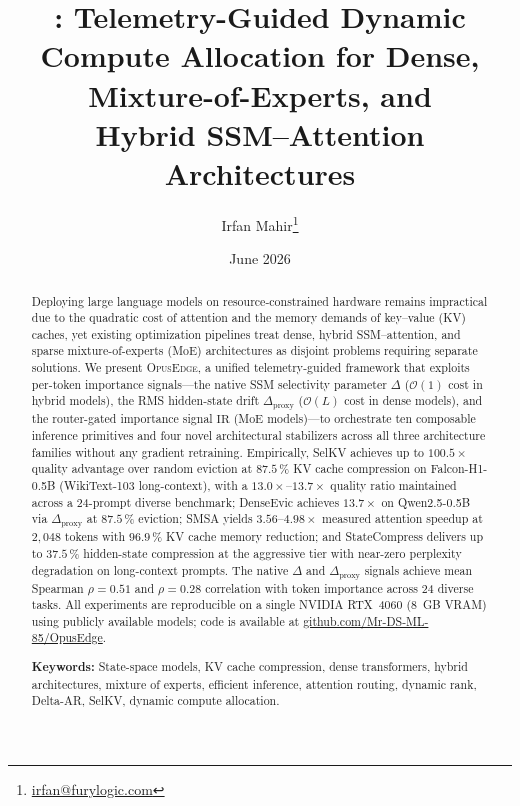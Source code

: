 \documentclass[11pt]{article}
\title{\textbf{\opusedge{}: Telemetry-Guided Dynamic Compute Allocation for
       Dense, Mixture-of-Experts, and\\ Hybrid SSM--Attention Architectures}}
\author[1]{Irfan Mahir\thanks{\href{mailto:irfan@furylogic.com}{irfan@furylogic.com}}}
\affil[1]{Furylogic Labs / Independent Researcher, Bangladesh \\
          Research conducted under the Infernix Inference Engine Project}
\date{June 2026}
\newcommand{\dsig}{\Delta}
\newcommand{\ir}{\mathrm{IR}}
\newcommand{\proxydsig}{\ensuremath{\dsig_{\mathrm{proxy}}}}
\newcommand{\opusedge}{\textsc{OpusEdge}}
\newcommand{\Order}{\mathcal{O}}
\begin{document}
\maketitle

\begin{abstract}
Deploying large language models on resource-constrained hardware remains
impractical due to the quadratic cost of attention and the memory demands of
key--value (KV) caches, yet existing optimization pipelines treat dense,
hybrid SSM--attention, and sparse mixture-of-experts (MoE) architectures as
disjoint problems requiring separate solutions. We present \opusedge, a
unified telemetry-guided framework that exploits per-token importance
signals---the native SSM selectivity parameter $\dsig$ ($\Order(1)$ cost in
hybrid models), the RMS hidden-state drift $\proxydsig$ ($\Order(L)$ cost in
dense models), and the router-gated importance signal $\ir$ (MoE models)---to
orchestrate ten composable inference primitives and four novel architectural
stabilizers across all three architecture families without any gradient
retraining. Empirically, SelKV achieves up to $100.5\!\times$ quality advantage
over random eviction at $87.5\,\%$ KV cache compression on Falcon-H1-0.5B
(WikiText-103 long-context), with a $13.0\!\times$--$13.7\!\times$ quality ratio
maintained across a 24-prompt diverse benchmark; DenseEvic achieves $13.7\!\times$
on Qwen2.5-0.5B via $\proxydsig$ at $87.5\,\%$ eviction; SMSA
yields $3.56$--$4.98\!\times$ measured attention speedup at $2{,}048$ tokens with
$96.9\,\%$ KV cache memory reduction; and StateCompress delivers up to
$37.5\,\%$ hidden-state compression at the aggressive tier with near-zero
perplexity degradation on long-context prompts. The native $\dsig$ and
$\proxydsig$ signals achieve mean Spearman $\rho{=}0.51$ and $\rho{=}0.28$
correlation with token importance across 24 diverse tasks. All experiments are reproducible on a
single NVIDIA RTX~4060 (8~GB VRAM) using publicly available models; code is
available at
\href{https://github.com/Mr-DS-ML-85/OpusEdge}{github.com/Mr-DS-ML-85/OpusEdge}.

\vspace{0.6em}
\noindent\textbf{Keywords:} State-space models, KV cache compression, dense
transformers, hybrid architectures, mixture of experts, efficient inference,
attention routing, dynamic rank, Delta-AR, SelKV, dynamic compute allocation.
\end{abstract}

\end{document}
